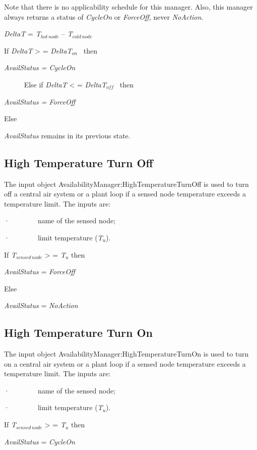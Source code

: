Note that there is no applicability schedule for this manager. Also, this manager always returns a status of \emph{CycleOn} or \emph{ForceOff}, never \emph{NoAction}.

\emph{DeltaT} = \emph{T\(_{hot\, node}\)} -- \emph{T\(_{cold\, node}\)}

If \emph{DeltaT} \textgreater{} = \emph{DeltaT\(_{on}\)} ~then

\emph{AvailStatus = CycleOn}

~ ~~~~Else if \emph{DeltaT} \textless{} = \emph{DeltaT\(_{off}\)} ~then

\emph{AvailStatus = ForceOff}

Else

\emph{AvailStatus} remains in its previous state.

\subsection{High Temperature Turn Off}\label{high-temperature-turn-off}

The input object AvailabilityManager:HighTemperatureTurnOff is used to turn off a central air system or a plant loop if a sensed node temperature exceeds a temperature limit. The inputs are:

·~~~~~~~~name of the sensed node;

·~~~~~~~~limit temperature (\emph{T\(_{u}\)}).

If \emph{T\(_{sensed\, node}\)} \textgreater{} = \emph{T\(_{u}\)} then

\emph{AvailStatus} = \emph{ForceOff}

Else

\emph{AvailStatus} = \emph{NoAction}

\subsection{High Temperature Turn On}\label{high-temperature-turn-on}

The input object AvailabilityManager:HighTemperatureTurnOn is used to turn on a central air system or a plant loop if a sensed node temperature exceeds a temperature limit. The inputs are:

·~~~~~~~~name of the sensed node;

·~~~~~~~~limit temperature (\emph{T\(_{u}\)}).

If \emph{T\(_{sensed\, node}\)} \textgreater{} = \emph{T\(_{u}\)} then

\emph{AvailStatus} = \emph{CycleOn}

